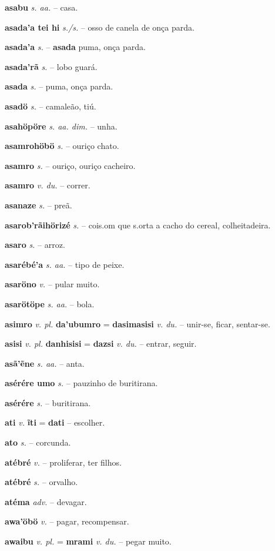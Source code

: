 \textbf{asabu} \textit{s. aa.} -- casa.

\textbf{asada'a tei hi} \textit{s./s.} -- osso de canela de onça parda.

\textbf{asada'a} \textit{s.} -- \textbf{asada} puma, onça parda.

\textbf{asada'rã} \textit{s.} -- lobo guará.

\textbf{asada} \textit{s.} -- puma, onça parda.

\textbf{asadö} \textit{s.} -- camaleão, tiú.

\textbf{asahöpöre} \textit{s. aa. dim.} -- unha.

\textbf{asamrohöbö} \textit{s.} -- ouriço chato.

\textbf{asamro} \textit{s.} -- ouriço, ouriço cacheiro.

\textbf{asamro} \textit{v. du.} -- correr.

\textbf{asanaze} \textit{s.} -- preã.

\textbf{asarob'rãihörizé} \textit{s.} -- cois.om que s.orta a cacho do cereal, colheitadeira.

\textbf{asaro} \textit{s.} -- arroz.

\textbf{asarébé'a} \textit{s. aa.} -- tipo de peixe.

\textbf{asaröno} \textit{v.} -- pular muito.

\textbf{asarötöpe} \textit{s. aa.} -- bola.

\textbf{asimro} \textit{v. pl.} \textbf{da'ubumro} = \textbf{dasimasisi} \textit{v. du.} -- unir-se, ficar, sentar-se.

\textbf{asisi} \textit{v. pl.} \textbf{danhisisi} = \textbf{dazsi} \textit{v. du.} -- entrar, seguir.

\textbf{asã'ẽne} \textit{s. aa.} -- anta.

\textbf{asérére umo} \textit{s.} -- pauzinho de buritirana.

\textbf{asérére} \textit{s.} -- buritirana.

\textbf{ati} \textit{v.} \textbf{ĩti} = \textbf{dati} -- escolher.

\textbf{ato} \textit{s.} -- corcunda.

\textbf{atébré } \textit{v.} -- proliferar, ter filhos.

\textbf{atébré} \textit{s.} -- orvalho.

\textbf{atéma} \textit{adv.} -- devagar.

\textbf{awa'öbö} \textit{v.} -- pagar, recompensar.

\textbf{awaibu} \textit{v. pl.} = \textbf{mrami} \textit{v. du.} -- pegar muito.

